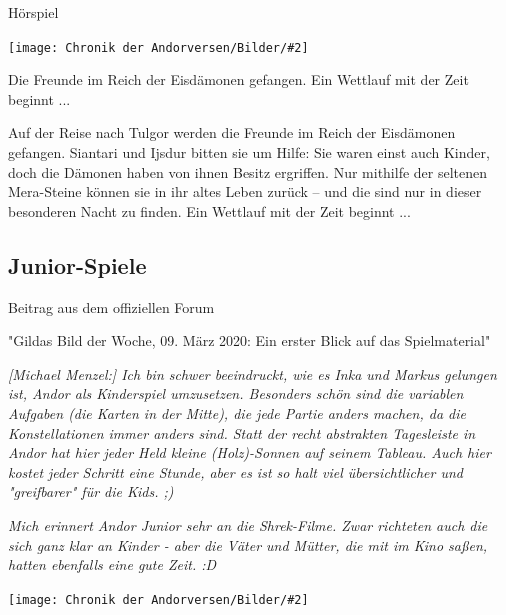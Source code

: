 \documentclass[10pt, a4paper, oneside]{book}
\newcommand{\bildmitts}[2][height=0.32\textwidth,width=0.48\textwidth,keepaspectratio]{%
    \begin{center}
        \texttt{[image: Chronik der Andorversen/Bilder/\#2]}
    \end{center}
}
\begin{document}
\begin{multicols}{2}
\begin{center}
    Hörspiel
\end{center}

\bildmitts{Die Dämonen im Eis (2024).jpeg}

Die Freunde im Reich der Eisdämonen gefangen. Ein Wettlauf mit der Zeit beginnt ...

Auf der Reise nach Tulgor werden die Freunde im Reich der Eisdämonen gefangen. Siantari und Ijsdur bitten sie um Hilfe: Sie waren einst auch Kinder, doch die Dämonen haben von ihnen Besitz ergriffen. Nur mithilfe der seltenen Mera-Steine können sie in ihr altes Leben zurück – und die sind nur in dieser besonderen Nacht zu finden. Ein Wettlauf mit der Zeit beginnt ...














\begin{chapterbox}

    \chapter{Junior-Spiele}
    
    \begin{center}
        Beitrag aus dem offiziellen Forum

        "Gildas Bild der Woche, 09. März 2020: Ein erster Blick auf das Spielmaterial"
    \end{center}
    
    \textit{[Michael Menzel:] Ich bin schwer beeindruckt, wie es Inka und Markus gelungen ist, Andor als Kinderspiel umzusetzen. Besonders schön sind die variablen Aufgaben (die Karten in der Mitte), die jede Partie anders machen, da die Konstellationen immer anders sind. Statt der recht abstrakten Tagesleiste in Andor hat hier jeder Held kleine (Holz)-Sonnen auf seinem Tableau. Auch hier kostet jeder Schritt eine Stunde, aber es ist so halt viel übersichtlicher und "greifbarer" für die Kids. ;)}
    
    \textit{Mich erinnert Andor Junior sehr an die Shrek-Filme. Zwar richteten auch die sich ganz klar an Kinder - aber die Väter und Mütter, die mit im Kino saßen, hatten ebenfalls eine gute Zeit. :D}
    
    
    \bildmitts[width=\textwidth]{Andor Junior Feiern.jpeg}

\end{chapterbox}




\end{multicols}
\end{document}
